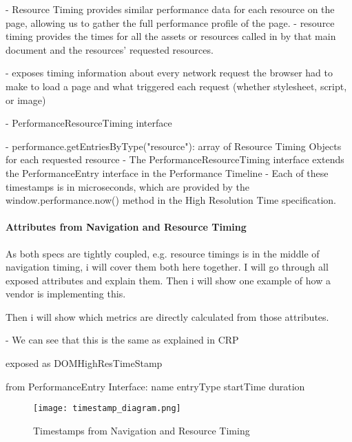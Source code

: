 - Resource Timing provides similar performance data for each resource on the page, allowing us to gather the full performance profile of the page.
- resource timing provides the times for all the assets or resources called in by that main document and the resources' requested resources.


- exposes timing information about every network request the browser had to make to load a page and what triggered each request (whether stylesheet, script, or image)






- PerformanceResourceTiming interface 


- performance.getEntriesByType("resource"): array of Resource Timing Objects for each requested resource
- The PerformanceResourceTiming interface extends the PerformanceEntry interface in the Performance Timeline
- Each of these timestamps is in microseconds, which are provided by the window.performance.now() method in the High Resolution Time specification.








\paragraph{Attributes from Navigation and Resource Timing}


As both specs are tightly coupled, e.g. resource timings is in the middle of navigation timing, i will cover them both here together.
I will go through all exposed attributes and explain them.
Then i will show one example of how a vendor is implementing this.

Then i will show which metrics are directly calculated from those attributes.




- We can see that this is the same as explained in CRP

exposed as DOMHighResTimeStamp


from PerformanceEntry Interface:
name
entryType
startTime
duration


\begin{figure}[h!]
\begin{center}
\texttt{[image: timestamp\_diagram.png]}
\caption{Timestamps from Navigation and Resource Timing}
\label{img:latency}
\end{center}
\end{figure}



